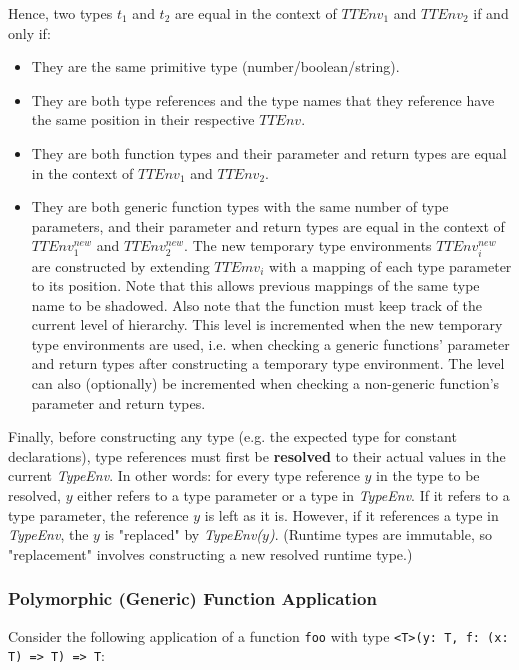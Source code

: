 Hence, two types $t_1$ and $t_2$ are equal in the context of $TTEnv_1$ and $TTEnv_2$ if and only if:
\begin{itemize}
    \item They are the same primitive type (number/boolean/string).
    \item They are both type references and the type names that they reference have the same position in their respective $TTEnv$.
    \item They are both function types and their parameter and return types are equal in the context of $TTEnv_1$ and $TTEnv_2$.
    \item They are both generic function types with the same number of type parameters, and their parameter and return types are equal in the context of $TTEnv_1^{new}$ and $TTEnv_2^{new}$. 
    The new temporary type environments $TTEnv_i^{new}$ are constructed by extending $TTEmv_i$ with a mapping of each type parameter to its position. Note that this allows previous mappings of the same type name to be shadowed.
    Also note that the function must keep track of the current level of hierarchy. This level is incremented when the new temporary type environments are used, i.e. when checking a generic functions' parameter and return types after constructing a temporary type environment. The level can also (optionally) be incremented when checking a non-generic function's parameter and return types.
\end{itemize}

Finally, before constructing any type (e.g. the expected type for constant declarations), type references must first be \textbf{resolved} to their actual values in the current \textit{TypeEnv}. 
In other words: for every type reference $y$ in the type to be resolved, $y$ either refers to a type parameter or a type in \textit{TypeEnv}. If it refers to a type parameter, the reference $y$ is left as it is. However, if it references a type in \textit{TypeEnv}, the $y$ is "replaced" by \textit{TypeEnv($y$)}. 
(Runtime types are immutable, so "replacement" involves constructing a new resolved runtime type.)


\subsubsection*{Polymorphic (Generic) Function Application}

Consider the following application of a function \verb|foo| with type 
\verb|<T>(y: T, f: (x: T) => T) => T|:

